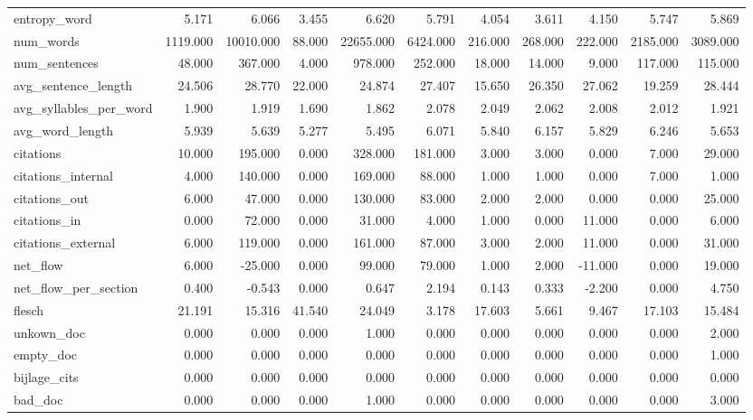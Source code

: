 \begin{tabular}{lrrrrrrrrrr}
\cline{1-11}
entropy\_word & 5.171 & 6.066 & 3.455 & 6.620 & 5.791 & 4.054 & 3.611 & 4.150 & 5.747 & 5.869 \\
\cline{1-11}
num\_words & 1119.000 & 10010.000 & 88.000 & 22655.000 & 6424.000 & 216.000 & 268.000 & 222.000 & 2185.000 & 3089.000 \\
\cline{1-11}
num\_sentences & 48.000 & 367.000 & 4.000 & 978.000 & 252.000 & 18.000 & 14.000 & 9.000 & 117.000 & 115.000 \\
\cline{1-11}
avg\_sentence\_length & 24.506 & 28.770 & 22.000 & 24.874 & 27.407 & 15.650 & 26.350 & 27.062 & 19.259 & 28.444 \\
\cline{1-11}
avg\_syllables\_per\_word & 1.900 & 1.919 & 1.690 & 1.862 & 2.078 & 2.049 & 2.062 & 2.008 & 2.012 & 1.921 \\
\cline{1-11}
avg\_word\_length & 5.939 & 5.639 & 5.277 & 5.495 & 6.071 & 5.840 & 6.157 & 5.829 & 6.246 & 5.653 \\
\cline{1-11}
citations & 10.000 & 195.000 & 0.000 & 328.000 & 181.000 & 3.000 & 3.000 & 0.000 & 7.000 & 29.000 \\
\cline{1-11}
citations\_internal & 4.000 & 140.000 & 0.000 & 169.000 & 88.000 & 1.000 & 1.000 & 0.000 & 7.000 & 1.000 \\
\cline{1-11}
citations\_out & 6.000 & 47.000 & 0.000 & 130.000 & 83.000 & 2.000 & 2.000 & 0.000 & 0.000 & 25.000 \\
\cline{1-11}
citations\_in & 0.000 & 72.000 & 0.000 & 31.000 & 4.000 & 1.000 & 0.000 & 11.000 & 0.000 & 6.000 \\
\cline{1-11}
citations\_external & 6.000 & 119.000 & 0.000 & 161.000 & 87.000 & 3.000 & 2.000 & 11.000 & 0.000 & 31.000 \\
\cline{1-11}
net\_flow & 6.000 & -25.000 & 0.000 & 99.000 & 79.000 & 1.000 & 2.000 & -11.000 & 0.000 & 19.000 \\
\cline{1-11}
net\_flow\_per\_section & 0.400 & -0.543 & 0.000 & 0.647 & 2.194 & 0.143 & 0.333 & -2.200 & 0.000 & 4.750 \\
\cline{1-11}
flesch & 21.191 & 15.316 & 41.540 & 24.049 & 3.178 & 17.603 & 5.661 & 9.467 & 17.103 & 15.484 \\
\cline{1-11}
unkown\_doc & 0.000 & 0.000 & 0.000 & 1.000 & 0.000 & 0.000 & 0.000 & 0.000 & 0.000 & 2.000 \\
\cline{1-11}
empty\_doc & 0.000 & 0.000 & 0.000 & 0.000 & 0.000 & 0.000 & 0.000 & 0.000 & 0.000 & 1.000 \\
\cline{1-11}
bijlage\_cits & 0.000 & 0.000 & 0.000 & 0.000 & 0.000 & 0.000 & 0.000 & 0.000 & 0.000 & 0.000 \\
\cline{1-11}
bad\_doc & 0.000 & 0.000 & 0.000 & 1.000 & 0.000 & 0.000 & 0.000 & 0.000 & 0.000 & 3.000 \\
\cline{1-11}
\bottomrule
\end{tabular}
